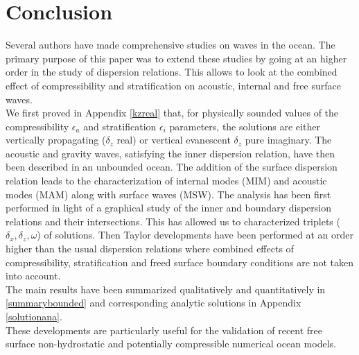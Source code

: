 \section{Conclusion}
\label{SectionDiscussion}
Several authors have made comprehensive studies on waves in the ocean. The primary purpose of this paper was to extend these studies by going at an higher order in the study of dispersion relations. This allows to look at the combined effect of compressibility and stratification on acoustic, internal and free surface waves. \\
We first proved in Appendix \ref{kzreal} that, for physically sounded values of the compressibility $\epsilon_a$ and stratification $\epsilon_i$ parameters, the solutions are either vertically propagating ($\delta_z$ real) or vertical evanescent $\delta_z$ pure imaginary.
The acoustic and gravity waves, satisfying the inner dispersion relation, have then been described in an unbounded ocean. The addition of the surface dispersion relation leads to the characterization of internal modes (MIM) and acoustic modes (MAM) along with surface waves (MSW). The analysis has been first performed in light of a graphical study of the inner and boundary dispersion relations and their intersections. This has allowed us to characterized triplets ($\delta_x, \delta_z, \omega$) of solutions. Then Taylor developments have been performed at an order higher than the usual dispersion relations where combined effects of compressibility, stratification and freed surface boundary conditions are not taken into account.\\
The main results have been summarized qualitatively and quantitatively in \ref{summarybounded} and corresponding analytic solutions in Appendix \ref{solutionana}.\\
These developments are particularly useful for the validation of recent free surface non-hydrostatic and potentially compressible numerical ocean models.
%
